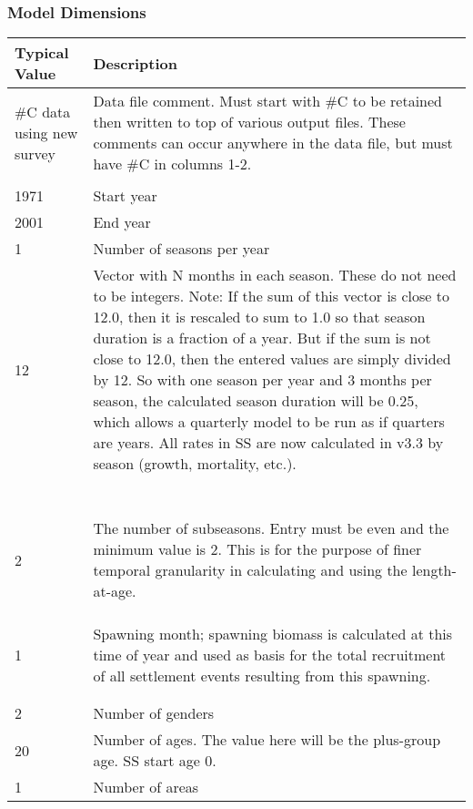 \subsubsection{Model Dimensions}
\begin{center}
	\begin{tabular}{p{4cm} p{12cm}}
			\textbf{Typical Value} & \textbf{Description} \\
			\hline
			\#C data using new survey & \multirow{1}{1cm}[-0.1cm]{\parbox{12cm}{Data file comment. Must start with \#C to be retained then written to top of various output files.  These comments can occur anywhere in the data file, but must have \#C in columns 1-2.}} \\
			&  \\
			\hline
			1971 & Start year \\
			\hline
			2001 & End year \\
			\hline
			1 & Number of seasons per year \\
			\hline
			12 & \multirow{1}{1cm}[-0.1cm]{\parbox{12cm}{Vector with N months in each season.  These do not need to be integers.  Note:  If the sum of this vector is close to 12.0, then it is rescaled to sum to 1.0 so that season duration is a fraction of a year.  But if the sum is not close to 12.0, then the entered values are simply divided by 12.  So with one season per year and 3 months per season, the calculated season duration will be 0.25, which allows a quarterly model to be run as if quarters are years.  All rates in SS are now calculated in v3.3 by season (growth, mortality, etc.).}} \\
			& \\
			& \\
			& \\
			& \\
			& \\
			& \\
			& \\
			\hline
			2 & \multirow{1}{1cm}[-0.1cm]{\parbox{12cm}{The number of subseasons.  Entry must be even and the minimum value is 2. This is for the purpose of finer temporal granularity in calculating and using the length-at-age.}}\\
			& \\
			& \\
			& \\
			\hline
			1 & \multirow{1}{1cm}[-0.1cm]{\parbox{12cm}{Spawning month; spawning biomass is calculated at this time of year and used as basis for the total recruitment of all settlement events resulting from this spawning.}}\\
			& \\
			& \\
			\hline
			2 & Number of genders \\
			\hline
			20 & Number of ages. The value here will be the plus-group age.  SS start age 0. \\
			\hline
			1 & Number of areas \\
			\hline
	\end{tabular}
\end{center}


